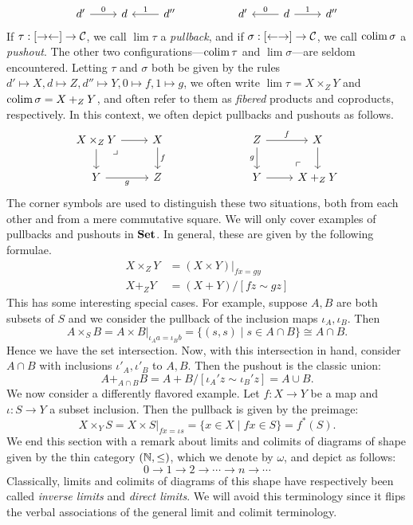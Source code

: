 \[
\begin{tikzcd}
d'\arrow[r,"0"] & d & d''\arrow[l,"1"'] & & d' & d \arrow[r,"1"] \arrow[l,"0"'] & d''
\end{tikzcd}
\]
If $\tau:[\to\leftarrow]\to\mathcal{C}$, we call $\lim\tau$ a \emph{pullback}, and if $\sigma:[\leftarrow\to]\to\mathcal{C}$, we call $\operatorname{colim}\sigma$ a \emph{pushout}. The other two configurations---$\operatorname{colim}\tau$ and $\lim\sigma$---are seldom encountered. Letting $\tau$ and $\sigma$ both be given by the rules $d'\mapsto X,d\mapsto Z,d''\mapsto Y,0\mapsto f,1\mapsto g$, we often write $\lim\tau=X\times_ZY$ and $\operatorname{colim}\sigma=X+_ZY$, and often refer to them as \emph{fibered} products and coproducts, respectively. In this context, we often depict pullbacks and pushouts as follows.
\[
\begin{tikzcd}
X\times_Z Y  \arrow[dr, phantom, "\lrcorner", very near start]  \arrow[r] \arrow[d] & X \arrow[d,"f"] & & & Z \arrow[r,"f"] \arrow[d,"g"'] & X \arrow[d] \\
Y \arrow[r,"g"'] & Z & & & Y \arrow[r] & X+_Z Y  \arrow[ul, phantom, "\ulcorner", very near start]
\end{tikzcd}
\]
The corner symbols are used to distinguish these two situations, both from each other and from a mere commutative square. We will only cover examples of pullbacks and pushouts in $\mathbf{Set}$. In general, these are given by the following formulae.
\begin{align*}
    X\times_Z Y &= (X\times Y)|_{fx=gy} \\
    X+_Z Y      &= (X+Y)/[fz\sim gz]
\end{align*}
This has some interesting special cases. For example, suppose $A,B$ are both subsets of $S$ and we consider the pullback of the inclusion maps $\iota_A,\iota_B$. Then
\[A\times_S B=A\times B|_{\iota_A a=\iota_Bb}=\{(s,s)\mid s\in A\cap B\}\cong A\cap B.\]
Hence we have the set intersection. Now, with this intersection in hand, consider $A\cap B$ with inclusions $\iota'_A,\iota'_B$ to $A,B$. Then the pushout is the classic union:
\[A+_{A\cap B}B=A+B/[\iota_A'z\sim \iota_B'z]=A\cup B.\]
We now consider a differently flavored example. Let $f:X\to Y$ be a map and $\iota : S\to Y$ a subset inclusion. Then the pullback is given by the preimage:
\[X\times_Y S=X\times S|_{fx=\iota s}=\{x\in X\mid fx\in S\}=f^*(S).\]
We end this section with a remark about limits and colimits of diagrams of shape given by the thin category $(\mathbb N,\leq)$, which we denote by $\omega$, and depict as follows:
\[0\to 1\to 2\to \cdots \to n\to\cdots \]
Classically, limits and colimits of diagrams of this shape have respectively been called \emph{inverse limits} and \emph{direct limits}. We will avoid this terminology since it flips the verbal associations of the general limit and colimit terminology.

